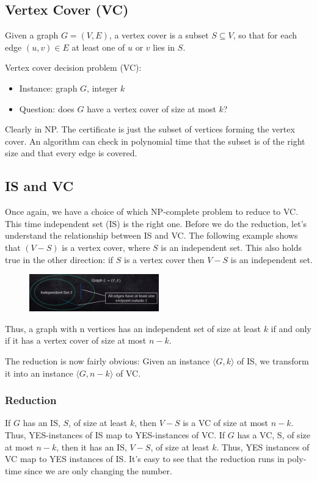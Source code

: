 \subsection{Vertex Cover (VC)}
Given a graph $G=(V,E)$, a vertex cover is a subset $S \subseteq V$, so that for each edge $(u,v) \in E$ at least one of $u$ or $v$ lies in $S$.

Vertex cover decision problem (VC):
\begin{itemize} 
	\item Instance: graph $G$, integer $k$
	\item Question: does $G$ have a vertex cover of size at most $k$?
\end{itemize}

Clearly in NP. The certificate is just the subset of vertices forming the vertex cover. An algorithm can check in polynomial time that the subset is of the right size and that every edge is covered.

\subsection{IS and VC}
Once again, we have a choice of which NP-complete problem to reduce to VC. This time independent set (IS) is the right one. Before we do the reduction, let's understand the relationship between IS and VC. The following example shows that $(V-S)$ is a vertex cover, where $S$ is an independent set. This also holds true in the other direction: if $S$ is a vertex cover then $V-S$ is an independent set.

\begin{figure}[H]
	\centering
	\includegraphics[width=0.5\textwidth]{fig/is-vc.png}
\end{figure}

Thus, a graph with n vertices has an independent set of size at least $k$ if and only if it has a vertex cover of size at most $n-k$.

The reduction is now fairly obvious: Given an instance $\langle G, k \rangle$ of IS, we transform it into an instance $\langle G,n-k \rangle$ of VC.

\subsubsection{Reduction}
If $G$ has an IS, $S$, of size at least $k$, then $V-S$ is a VC of size at most $n-k$. Thus, YES-instances of IS map to YES-instances of VC. If $G$ has a VC, S, of size at most $n-k$, then it has an IS, $V-S$, of size at least $k$. Thus, YES instances of VC map to YES instances of IS. It's easy to see that the reduction runs in poly-time since we are only changing the number.


